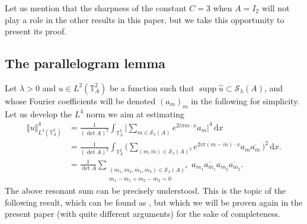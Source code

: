 \documentclass[a4paper,11pt]{amsart}
\numberwithin{equation}{section}
\theoremstyle{definition}
\DeclareMathOperator{\supp}{supp}
\newcommand{\twotorus}{\mathbb T^2_A}
\begin{document}
Let us mention that the sharpness of the constant $C=3$ when $A=I_2$ will not play a role in the other results in this paper, but we take this opportunity to 
present its proof.

\subsection{The parallelogram lemma} 

Let $\lambda>0$ and $u\in L^2(\twotorus)$ be a function such that $\supp\widehat u\subset\mathcal S_{\lambda}(A)$, and whose Fourier coefficients will be denoted $(a_m)_m$ in the following for simplicity. Let us develop the $L^4$ norm we aim at estimating
\begin{align}\label{eq:ressum}
	\Vert u\Vert_{L^4(\twotorus)}^4
	& = \frac1{(\det A)^2}\int_{\twotorus}\Big\vert \sum_{m\in\mathcal S_{\lambda}(A)} e^{2i\pi m\cdot x} a_m \Big\vert^4\,\mathrm dx \\[5pt]
	& = \frac1{(\det A)^2}\int_{\twotorus} \bigg(\sum_{(m, \overline m)\in\mathcal S_{\lambda}(A)^2}e^{2i\pi(m-\overline m)\cdot x} a_m \overline{a_{\overline m}}\, \bigg)^2\,\mathrm dx. \nonumber \\[5pt]
	& = \frac1{\det A}\sum_{\substack{(m_1,m_2,\overline m_1,\overline m_2)\in\mathcal S_{\lambda}(A)^4 \\[2pt] m_1 - \overline m_1 + m_2 - \overline m_2 = 0}}a_{m_1}\overline{a_{\overline m_1}}a_{m_2}\overline{a_{\overline m_2}}. \nonumber
\end{align}
The above resonant sum can be precisely understood. This is the topic of the following result, which can be found 
 as \cite[Equation (72)]{KKW}, but which we will be proven again in the present paper (with quite different arguments) for the sake of completeness.
\end{document}
